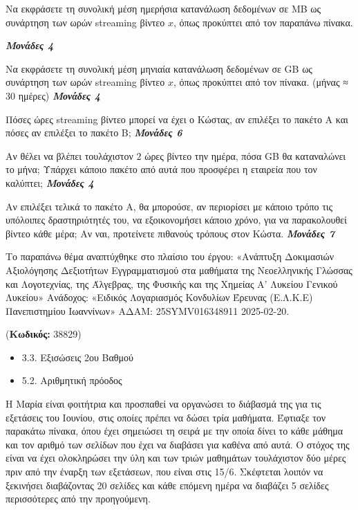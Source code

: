 \documentclass[11pt,a4paper,twoside]{book}
\newcounter{askhsh}[chapter]
\renewcommand{\theaskhsh}{
	\bf{\titlefont{\Large{\thechapter}}.\arabic{askhsh}}
}
\newcommand{\Askhsh}[2]{\refstepcounter{askhsh}{\titlefont{Άσκηση\theaskhsh} - \textcolor{maincolor}{ΘΕΜΑ #2}} ({\small{\textbf{Κωδικός:} #1}})\\}{}
\newenvironment{ylh}{
\begin{tcolorbox}[
breakable,
enhanced standard,
titlerule=0pt,
toprule=0pt, 
rightrule=0pt, 
bottomrule=0pt,
title={\titlefont Ύλη άσκησης},
colback=white,
opacityback=0,
left=2mm,
top=1mm,
bottom=0mm,
boxrule=0pt,
colframe=white,
borderline west={1.5mm}{0pt}{secondarycolor},
leftrule=2mm,
sharp corners,
coltitle=black
]
\begin{itemize}[leftmargin=3mm, itemsep=0mm, label=\textcolor{secondarycolor}{{\small\faBook}}]
}{
\end{itemize}
\end{tcolorbox}
}
\newcommand{\monades}[1]{
\hspace*{\fill}
\textbf{\textit{\textcolor{maincolor}{Μονάδες #1}}}}
\begin{document}
\begin{alist}
\item Να εκφράσετε τη συνολική μέση ημερήσια κατανάλωση δεδομένων σε MB ως συνάρτηση των ωρών streaming βίντεο $x$, όπως προκύπτει από τον παραπάνω πίνακα.
\monades{4}
\item Να εκφράσετε τη συνολική μέση μηνιαία κατανάλωση δεδομένων σε GB ως συνάρτηση των ωρών streaming βίντεο $x$, όπως προκύπτει από τον πίνακα. (μήνας ≈ $30$ ημέρες)\monades{4}
\item Πόσες ώρες streaming βίντεο μπορεί να έχει ο Κώστας, αν επιλέξει το πακέτο Α και πόσες αν επιλέξει το πακέτο Β;\monades{6}
\item Αν θέλει να βλέπει τουλάχιστον $2$ ώρες βίντεο την ημέρα, πόσα GB θα καταναλώνει το μήνα; Υπάρχει κάποιο πακέτο από αυτά που προσφέρει η εταιρεία που τον καλύπτει;\monades{4}
\item Αν επιλέξει τελικά το πακέτο Α, θα μπορούσε, αν περιορίσει με κάποιο τρόπο τις υπόλοιπες δραστηριότητές του, να εξοικονομήσει κάποιο χρόνο, για να παρακολουθεί βίντεο κάθε μέρα; Αν ναι, προτείνετε πιθανούς τρόπους στον Κώστα.\monades{7}

{\footnotesize Το παραπάνω θέμα αναπτύχθηκε στο πλαίσιο του έργου: «Ανάπτυξη Δοκιμασιών Αξιολόγησης Δεξιοτήτων Εγγραμματισμού στα μαθήματα της Νεοελληνικής Γλώσσας και Λογοτεχνίας, της Άλγεβρας, της Φυσικής και της Χημείας Α' Λυκείου Γενικού Λυκείου» Ανάδοχος: «Ειδικός Λογαριασμός Κονδυλίων Έρευνας (Ε.Λ.Κ.Ε) Πανεπιστημίου Ιωαννίνων» ΑΔΑΜ: 25SYMV016348911 2025-02-20.}
\end{alist}

\vspace{4mm}
\Askhsh{38829}{4}
\begin{ylh}
    \item 3.3. Εξισώσεις 2ου Βαθμού
    \item 5.2. Αριθμητική πρόοδος
\end{ylh}

Η Μαρία είναι φοιτήτρια και προσπαθεί να οργανώσει το διάβασμά της για τις εξετάσεις του Ιουνίου, στις οποίες πρέπει να δώσει τρία μαθήματα. Έφτιαξε τον παρακάτω πίνακα, όπου έχει σημειώσει τη σειρά με την οποία δίνει το κάθε μάθημα και τον αριθμό των σελίδων που έχει να διαβάσει για καθένα από αυτά. Ο στόχος της είναι να έχει ολοκληρώσει την ύλη και των τριών μαθημάτων τουλάχιστον δύο μέρες πριν από την έναρξη των εξετάσεων, που είναι στις 15/6. Σκέφτεται λοιπόν να ξεκινήσει διαβάζοντας 20 σελίδες και κάθε επόμενη ημέρα να διαβάζει 5 σελίδες περισσότερες από την προηγούμενη.
\end{document}
